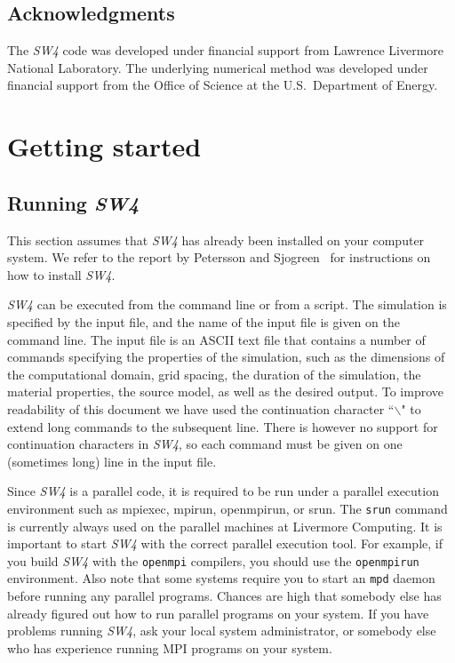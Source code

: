 \documentclass[11pt]{report}
\begin{document}
\section{Acknowledgments}
The \emph{SW4} code was developed under financial support from Lawrence Livermore National
Laboratory. The underlying numerical method was developed under financial support from
the Office of Science at the U.S.~Department of Energy.


\chapter{Getting started}

\section{Running \emph{SW4}}
This section assumes that \emph{SW4} has already been installed on your computer system. We refer to
the report by Petersson and Sjogreen~\cite{SW4-install} for instructions on how to install
\emph{SW4}.

\emph{SW4} can be executed from the command line or from a script. The simulation is specified by
the input file, and the name of the input file is given on the command line. The input file is an
ASCII text file that contains a number of commands specifying the properties of the simulation, such
as the dimensions of the computational domain, grid spacing, the duration of the simulation, the
material properties, the source model, as well as the desired output. To improve readability of this
document we have used the continuation character ``$\backslash$" to extend long commands to the
subsequent line. There is however no support for continuation characters in \emph{SW4}, so each
command must be given on one (sometimes long) line in the input file.

Since \emph{SW4} is a parallel code, it is required to be run under a parallel execution environment
such as mpiexec, mpirun, openmpirun, or srun. The \verb+srun+ command is currently always used on
the parallel machines at Livermore Computing. It is important to start \emph{SW4} with the correct
parallel execution tool. For example, if you build \emph{SW4} with the \verb+openmpi+ compilers, you
should use the \verb+openmpirun+ environment. Also note that some systems require you to start an
\verb+mpd+ daemon before running any parallel programs. Chances are high that somebody else has
already figured out how to run parallel programs on your system. If you have problems running
\emph{SW4}, ask your local system administrator, or somebody else who has experience running MPI
programs on your system.
\end{document}

